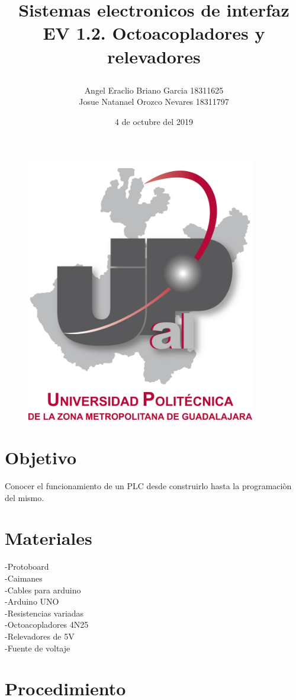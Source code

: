 \documentclass[12pt,a4paper]{article}
\title{\textbf{Sistemas electronicos de interfaz\\EV 1.2. Octoacopladores y relevadores}
\author{Angel Eraclio Briano Garcia 18311625\\Josue Natanael Orozco Nevares 18311797}
\date{4 de octubre del 2019}}
\begin{document}
\maketitle

\begin{figure}[h!]
\centering
\includegraphics[width=10cm]{UPCDLZMDG5783-logo.png}  
\end{figure}
\newpage

\section{Objetivo}
Conocer el funcionamiento de un PLC desde construirlo hasta la programaciòn del mismo.

\section{Materiales}
-Protoboard\\-Caimanes\\-Cables para arduino\\-Arduino UNO\\-Resistencias variadas\\-Octoacopladores 4N25\\-Relevadores de 5V\\-Fuente de voltaje

\section{Procedimiento}
\end{document}
